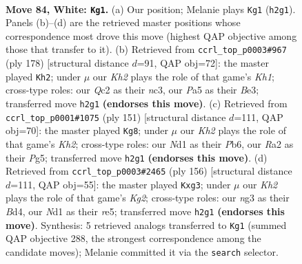 \documentclass[11pt]{article}
\begin{document}
\clearpage

\begin{figure}[p]\centering
\begin{subfigure}{0.46\textwidth}\centering
\resizebox{\linewidth}{!}{%
\newchessgame
\chessboard[
  setfen={8/6k1/8/P1p2p2/3p1Ppb/4P1n1/R1QBq2K/1r1N4 w - - 11 84},
  showmover=false,
  pgfstyle=straightmove, color=movearrow, markmove={h2-g1}
]}
\caption{}
\end{subfigure}\hfill
\begin{subfigure}{0.46\textwidth}\centering
\resizebox{\linewidth}{!}{%
\newchessgame
\chessboard[
  setfen={1r6/8/kp1Qp3/3pP1P1/p1p1qP2/P1n1B2R/8/7K w - - 6 90},
  showmover=false,
  pgfstyle=straightmove, color=movearrow, markmove={h1-h2}
]}
\caption{}
\end{subfigure}
\\[4pt]
\begin{subfigure}{0.46\textwidth}\centering
\resizebox{\linewidth}{!}{%
\newchessgame
\chessboard[
  setfen={8/4Q2k/1p3p2/3p2p1/3PnqP1/2P4p/P5P1/5NK1 b - - 11 76},
  showmover=false,
  pgfstyle=straightmove, color=movearrow, markmove={h7-g8}
]}
\caption{}
\end{subfigure}\hfill
\begin{subfigure}{0.46\textwidth}\centering
\resizebox{\linewidth}{!}{%
\newchessgame
\chessboard[
  setfen={8/R5bk/4p3/1p1pr1P1/1P1B4/2P2Qp1/2q3K1/8 w - - 2 79},
  showmover=false,
  pgfstyle=straightmove, color=movearrow, markmove={g2-g3}
]}
\caption{}
\end{subfigure}
\caption{\textbf{Move 84, White: \texttt{Kg1}.} (a) Our position; Melanie plays \texttt{Kg1} (\texttt{h2g1}). Panels (b)--(d) are the retrieved master positions whose correspondence most drove this move (highest QAP objective among those that transfer to it). (b) Retrieved from \texttt{ccrl\_top\_p0003\#967} (ply 178) [structural distance $d$=91, QAP obj=72]: the master played \texttt{Kh2}; under $\mu$ our \emph{Kh2} plays the role of that game's \emph{Kh1}; cross-type roles: our \emph{Q}c2 as their \emph{n}c3, our \emph{P}a5 as their \emph{B}e3; transferred move \texttt{h2g1} \textbf{(endorses this move)}. (c) Retrieved from \texttt{ccrl\_top\_p0001\#1075} (ply 151) [structural distance $d$=111, QAP obj=70]: the master played \texttt{Kg8}; under $\mu$ our \emph{Kh2} plays the role of that game's \emph{Kh2}; cross-type roles: our \emph{N}d1 as their \emph{P}b6, our \emph{R}a2 as their \emph{P}g5; transferred move \texttt{h2g1} \textbf{(endorses this move)}. (d) Retrieved from \texttt{ccrl\_top\_p0003\#2465} (ply 156) [structural distance $d$=111, QAP obj=55]: the master played \texttt{Kxg3}; under $\mu$ our \emph{Kh2} plays the role of that game's \emph{Kg2}; cross-type roles: our \emph{n}g3 as their \emph{B}d4, our \emph{N}d1 as their \emph{r}e5; transferred move \texttt{h2g1} \textbf{(endorses this move)}. Synthesis: 5 retrieved analogs transferred to \texttt{Kg1} (summed QAP objective 288, the strongest correspondence among the candidate moves); Melanie committed it via the \texttt{search} selector.}
\label{fig:thought-m166}
\end{figure}
\end{document}
